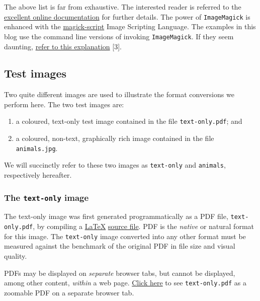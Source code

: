 \documentclass[
  11pt,
  british,
  a4paper,
]{article}
\providecommand{\tightlist}{%
  \setlength{\itemsep}{0pt}\setlength{\parskip}{0pt}}
\begin{document}
The above list is far from exhaustive. The interested reader is referred
to the
\href{https://imagemagick.org/script/command-line-tools.php}{excellent
online documentation} for further details. The power of
\texttt{ImageMagick} is enhanced with the
\href{https://imagemagick.org/script/magick-script.php}{magick-script}
Image Scripting Language. The examples in this blog use the command line
versions of invoking \texttt{ImageMagick}. If they seem daunting,
\href{https://imagemagick.org/script/command-line-processing.php}{refer
to this explanation} {[}3{]}.

\hypertarget{test-images}{%
\subsection{Test images}\label{test-images}}

Two quite different images are used to illustrate the format conversions
we perform here. The two test images are:

\begin{enumerate}
\tightlist
\item
  a coloured, text-only test image contained in the file
  \texttt{text-only.pdf}; and
\item
  a coloured, non-text, graphically rich image contained in the file
  \texttt{animals.jpg}.
\end{enumerate}

We will succinctly refer to these two images as \texttt{text-only} and
\texttt{animals}, respectively hereafter.

\hypertarget{the-text-only-image}{%
\subsubsection{\texorpdfstring{The \texttt{text-only}
image}{The text-only image}}\label{the-text-only-image}}

The text-only image was first generated programmatically as a PDF file,
\texttt{text-only.pdf}, by compiling a
\href{https://www.latex-project.org/}{LaTeX}
\href{auxiliary/text-only.tex}{source file}. PDF is the \emph{native} or
natural format for this image. The \texttt{text-only} image converted
into any other format must be measured against the benchmark of the
original PDF in file size and visual quality.

PDFs may be displayed on \emph{separate} browser tabs, but cannot be
displayed, among other content, \emph{within} a web page.
\href{images/text-only.pdf}{Click here} to see \texttt{text-only.pdf} as
a zoomable PDF on a separate browser tab.
\end{document}
